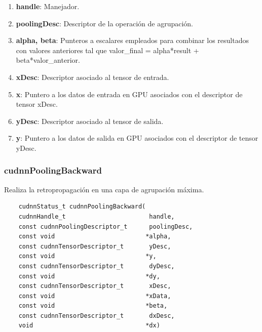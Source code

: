 \begin{enumerate}
	\item \textbf{handle}: Manejador.
	\item \textbf{poolingDesc}: Descriptor de la operación de agrupación.
	\item \textbf{alpha, beta}: Punteros a escalares empleados para combinar los resultados con valores anteriores tal que valor\_final = alpha*result + beta*valor\_anterior.
	\item \textbf{xDesc}: Descriptor asociado al tensor de entrada.
	\item \textbf{x}: Puntero a los datos de entrada en GPU asociados con el descriptor de tensor xDesc.
	\item \textbf{yDesc}: Descriptor asociado al tensor de salida.
	\item \textbf{y}: Puntero a los datos de salida en GPU asociados con el descriptor de tensor yDesc.
\end{enumerate}
\cite{cuDNN_pool_fwd}

\subsubsection{cudnnPoolingBackward}
Realiza la retropropagación en una capa de agrupación máxima.

\begin{verbatim}
	cudnnStatus_t cudnnPoolingBackward(
	cudnnHandle_t                       handle,
	const cudnnPoolingDescriptor_t      poolingDesc,
	const void                         *alpha,
	const cudnnTensorDescriptor_t       yDesc,
	const void                         *y,
	const cudnnTensorDescriptor_t       dyDesc,
	const void                         *dy,
	const cudnnTensorDescriptor_t       xDesc,
	const void                         *xData,
	const void                         *beta,
	const cudnnTensorDescriptor_t       dxDesc,
	void                               *dx)
\end{verbatim}

